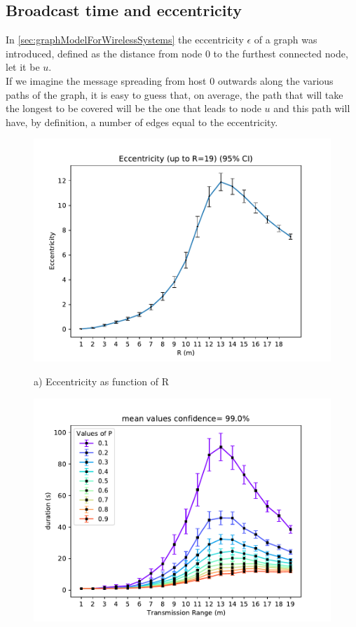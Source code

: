 \subsection{Broadcast time and eccentricity}
In \ref{sec:graphModelForWirelessSystems} the eccentricity $\epsilon$ of a graph was introduced, defined as the distance from node 0 to the furthest connected node, let it be $u$.\\
If we imagine the message spreading from host 0 outwards along the various paths of the graph, it is easy to guess that, on average, the path that will take the longest to be covered will be the one that leads to node $u$ and this path will have, by definition, a number of edges equal to the eccentricity.\\
\begin{figure}[H]
	\begin{minipage}{.5\textwidth}
        \includegraphics[scale=.5]{img/graphAnalysisEccentricityR19.pdf}
        \begin{center}
            a) Eccentricity as function of R
        \end{center}
	\end{minipage}
	\begin{minipage}{.5\textwidth} 
		\includegraphics[scale=.5]{img/Big_DurRange_mean.pdf}

\end{minipage}
\end{figure}
